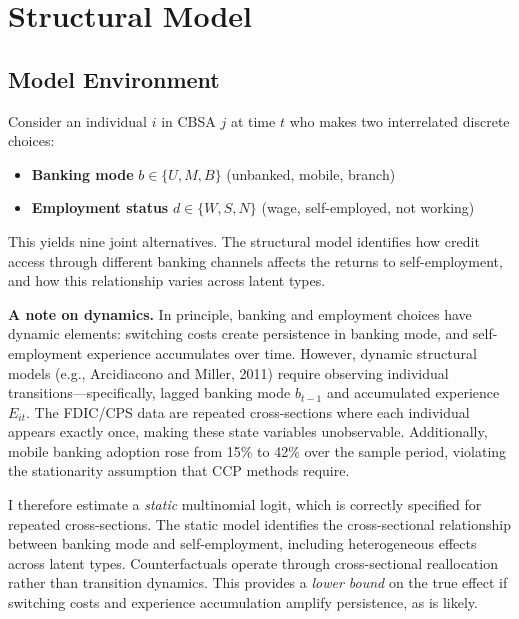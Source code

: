 \documentclass[12pt]{article}
\begin{document}
\section{Structural Model}

\subsection{Model Environment}

Consider an individual $i$ in CBSA $j$ at time $t$ who makes two interrelated discrete choices:

\begin{itemize}
    \item \textbf{Banking mode} $b \in \{U, M, B\}$ (unbanked, mobile, branch)
    \item \textbf{Employment status} $d \in \{W, S, N\}$ (wage, self-employed, not working)
\end{itemize}

This yields nine joint alternatives. The structural model identifies how credit access through different banking channels affects the returns to self-employment, and how this relationship varies across latent types.

\textbf{A note on dynamics.} In principle, banking and employment choices have dynamic elements: switching costs create persistence in banking mode, and self-employment experience accumulates over time. However, dynamic structural models (e.g., Arcidiacono and Miller, 2011) require observing individual transitions---specifically, lagged banking mode $b_{t-1}$ and accumulated experience $E_{it}$. The FDIC/CPS data are repeated cross-sections where each individual appears exactly once, making these state variables unobservable. Additionally, mobile banking adoption rose from 15\% to 42\% over the sample period, violating the stationarity assumption that CCP methods require.

I therefore estimate a \textit{static} multinomial logit, which is correctly specified for repeated cross-sections. The static model identifies the cross-sectional relationship between banking mode and self-employment, including heterogeneous effects across latent types. Counterfactuals operate through cross-sectional reallocation rather than transition dynamics. This provides a \textit{lower bound} on the true effect if switching costs and experience accumulation amplify persistence, as is likely.
\end{document}

